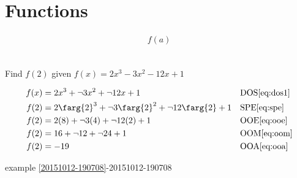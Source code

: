 \documentclass[20150903-160354-rs2.2-MarksMathNotebook.tex]{subfiles}
\begin{document}
%
%

\chapter{Functions}

\begin{property}
\begin{subequations}
\begin{align}
f(a) \label{eq:fvas}
\end{align}
\end{subequations}
\end{property}

\begin{example}[id:20151012-201647] \label{20151012-201647} \hfill \\
Find $f(2)$ given $f(x)=2x^3-3x^2-12x+1$
\soln

\solnsteps
\begin{align*}
f(x) & =2x^3 + \neg 3x^2 + \neg 12x+1 && \text{DOS} \eqref{eq:dos1} \\
f(2) &= 2\farg{2}^3 + \neg 3\farg{2}^2 + \neg 12 \farg{2} +1 && \text{SPE} \eqref{eq:spe} \\
f(2) &= 2(8) + \neg 3(4) + \neg 12(2) + 1 && \text{OOE} \eqref{eq:ooe} \\
f(2) &= 16 + \neg 12 + \neg 24 +1 && \text{OOM} \eqref{eq:oom} \\
f(2) &= -19 && \text{OOA} \eqref{eq:ooa} \\
\end{align*}

\qdepend

\qdependlist
example \ref{20151012-190708}-20151012-190708

\end{example}
\end{document}

